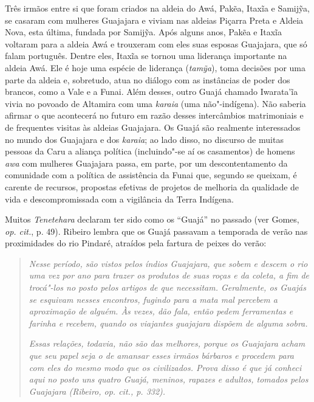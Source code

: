 Três irmãos entre si que foram criados na aldeia do Awá, Pakẽa, Itaxĩa e
Samijỹa, se casaram com mulheres Guajajara e viviam nas aldeias Piçarra
Preta e Aldeia Nova, esta última, fundada por Samijỹa. Após alguns anos,
Pakẽa e Itaxĩa voltaram para a aldeia Awá e trouxeram com eles suas
esposas Guajajara, que só falam português. Dentre eles, Itaxĩa se tornou
uma liderança importante na aldeia Awá. Ele é hoje uma espécie de
liderança (\emph{tamỹa}), toma decisões por uma parte da aldeia e,
sobretudo, atua no diálogo com as instâncias de poder dos brancos, como
a Vale e a Funai. Além desses, outro Guajá chamado Iwarata'ĩa vivia no
povoado de Altamira com uma \emph{karaia} (uma não"-indígena). Não
saberia afirmar o que acontecerá no futuro em razão desses intercâmbios
matrimoniais e de frequentes visitas às aldeias Guajajara. Os Guajá são
realmente interessados no mundo dos Guajajara e dos \emph{karaia}; ao
lado disso, no discurso de muitas pessoas da  Caru a aliança política
(incluindo"-se aí os casamentos) de homens \emph{awa} com mulheres
Guajajara passa, em parte, por um descontentamento da comunidade com a
política de assistência da Funai que, segundo se queixam, é carente de
recursos, propostas efetivas de projetos de melhoria da qualidade de
vida e descompromissada com a vigilância da Terra Indígena.

Muitos \emph{Tenetehara} declaram ter sido como os ``Guajá'' no passado
(ver Gomes, \emph{op. cit.}, p. 49). Ribeiro lembra que os Guajá passavam a
temporada de verão nas proximidades do rio Pindaré, atraídos pela
fartura de peixes do verão:

\begin{quote}
\emph{Nesse período, são vistos pelos índios Guajajara, que sobem e descem o
rio uma vez por ano para trazer os produtos de suas roças e da coleta, a
fim de trocá"-los no posto pelos artigos de que necessitam. Geralmente,
os Guajás se esquivam nesses encontros, fugindo para a mata mal percebem
a aproximação de alguém. Às vezes, dão fala, então pedem ferramentas e
farinha e recebem, quando os viajantes guajajara dispõem de alguma
sobra.}

\noindent\emph{Essas relações, todavia, não são das melhores, porque os Guajajara acham
que seu papel seja o de amansar esses irmãos bárbaros e procedem para
com eles do mesmo modo que os civilizados. Prova disso é que já conheci
aqui no posto uns quatro Guajá, meninos, rapazes e adultos, tomados
pelos Guajajara (Ribeiro, \emph{op. cit.}, p. 332).}
\end{quote}

